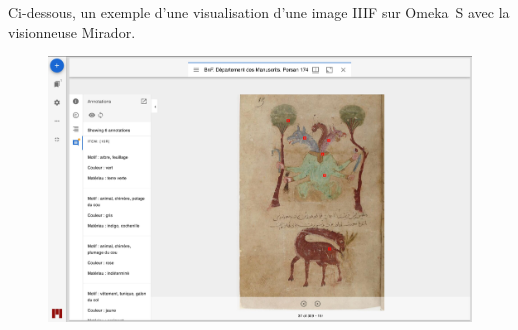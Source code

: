 Ci-dessous, un exemple d’une visualisation d’une image IIIF sur Omeka S avec la visionneuse Mirador.

\begin{figure}[H]
	\centering
	\includegraphics[width=\textwidth]{./textes/annexe/omeka-exemple.jpg}
	\label{fig:info}
\end{figure}